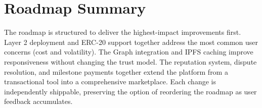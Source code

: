 \section{Roadmap Summary}

The roadmap is structured to deliver the highest-impact improvements first. Layer 2 deployment and ERC-20 support together address the most common user concerns (cost and volatility). The Graph integration and IPFS caching improve responsiveness without changing the trust model. The reputation system, dispute resolution, and milestone payments together extend the platform from a transactional tool into a comprehensive marketplace. Each change is independently shippable, preserving the option of reordering the roadmap as user feedback accumulates.
